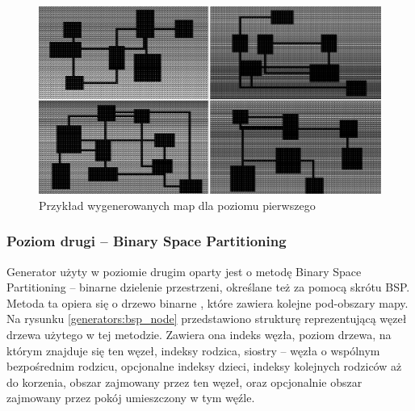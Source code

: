 \documentclass[12pt,twoside]{article}
\begin{document}
\FloatBarrier
\begin{figure}[ht]
	\centering
	\includegraphics[width=14cm]{images/generators/level1.png}
	\caption{Przykład wygenerowanych map dla poziomu pierwszego}
	\label{generators:level1}
\end{figure}
\FloatBarrier


\subsubsection{Poziom drugi -- Binary Space Partitioning}
Generator użyty w poziomie drugim oparty jest o metodę Binary Space Partitioning \cite{bsp_source} -- binarne dzielenie przestrzeni, określane też za pomocą skrótu BSP. Metoda ta opiera się o drzewo binarne \cite{book_algo}, które zawiera kolejne pod-obszary mapy. Na rysunku \ref{generators:bsp_node} przedstawiono strukturę reprezentującą węzeł drzewa użytego w tej metodzie. Zawiera ona indeks węzła, poziom drzewa, na którym znajduje się ten węzeł, indeksy rodzica, siostry -- węzła o wspólnym bezpośrednim rodzicu, opcjonalne indeksy dzieci, indeksy kolejnych rodziców aż do korzenia, obszar zajmowany przez ten węzeł, oraz opcjonalnie obszar zajmowany przez pokój umieszczony w tym węźle.
\end{document}
